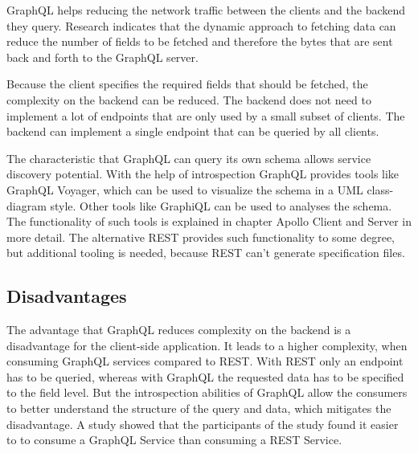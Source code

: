 GraphQL helps reducing the network traffic between the clients and the backend they query. Research indicates that the dynamic approach to fetching data can reduce the number of fields to be fetched and therefore the bytes that are sent back and forth to the GraphQL server. \cite{inprocessdings:2019:background:graphql:migration-to-graphql}

\bigskip

\noindent Because the client specifies the required fields that should be fetched, the complexity on the backend can be reduced. The backend does not need to implement a lot of endpoints that are only used by a small subset of clients. The backend can implement a single endpoint that can be queried by all clients. \cite{book:2018:richardson:background:bff:microservices-patterns}

\bigskip

\noindent The characteristic that GraphQL can query its own schema allows service discovery potential. With the help of introspection GraphQL provides tools like GraphQL Voyager, which can be used to visualize the schema in a UML class-diagram style. Other tools like GraphiQL can be used to analyses the schema. The functionality of such tools is explained in chapter Apollo Client and Server in more detail. The alternative REST provides such functionality to some degree, but additional tooling is needed, because REST can't generate specification files.


\subsection{Disadvantages}\label{subsection:background:graphql:graphql-disadvantages}

\noindent The advantage that GraphQL reduces complexity on the backend is a disadvantage for the client-side application. It leads to a higher complexity, when consuming GraphQL services compared to REST. With REST only an endpoint has to be queried, whereas with GraphQL the requested data has to be specified to the field level. But the introspection abilities of GraphQL allow the consumers to better understand the structure of the query and data, which mitigates the disadvantage. A study \cite{inproceedings:2020:brito:background:graphql:rest-vs-graphql} showed that the participants of the study found it easier to to consume a GraphQL Service than consuming a REST Service.



